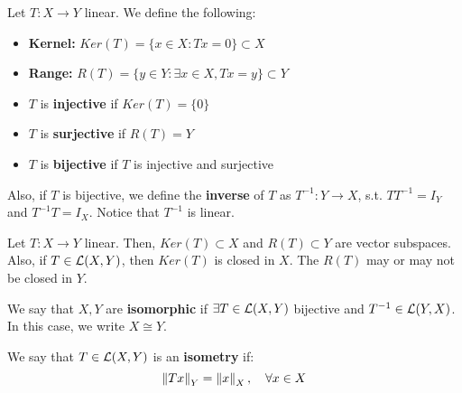 \begin{fdefinition}
    Let $T: X \to Y$ linear. We define the following:
    \vspace{1em}
    \begin{itemize}
        \item \textbf{Kernel:} $Ker(T) = \{x \in X: Tx = 0\} \subset X$
        \vspace{1em}
        \item \textbf{Range:} $R(T) = \{y \in Y: \exists x \in X, Tx = y\} \subset Y$
        \vspace{1em}
        \item $T$ is \textbf{injective} if $Ker(T) = \{0\}$
        \vspace{1em}
        \item $T$ is \textbf{surjective} if $R(T) = Y$
        \vspace{1em}
        \item $T$ is \textbf{bijective} if $T$ is injective and surjective
    \end{itemize}
    \vspace{1em}

    Also, if $T$ is bijective, we define the \textbf{inverse} of $T$ as $T^{-1}: Y \to X$,
    s.t. $T T^{-1} = I_Y$ and $T^{-1} T = I_X$.
    Notice that $T^{-1}$ is linear.
\end{fdefinition}

\begin{fremark}
    Let $T: X \to Y$ linear. Then, $Ker(T) \subset X$ and $R(T) \subset Y$ are
    vector subspaces. Also, if $T \in \mathcal{L}(X, Y)$, then $Ker(T)$ is closed in $X$.
    The $R(T)$ may or may not be closed in $Y$.
\end{fremark}

\vspace{1em}

\begin{fdefinition}[Isomorphism]
    We say that $X, Y$ are \textbf{isomorphic} if $\exists T \in \mathcal{L}(X, Y)$ bijective
    and $T^{-1} \in \mathcal{L}(Y, X)$.\\

    In this case, we write $X \cong Y$.
\end{fdefinition}

\begin{fdefinition}
     We say that $T \in \mathcal{L}(X, Y)$ is an \textbf{isometry} if:
     $$\left\|Tx\right\|_Y = \left\|x\right\|_X, \quad \forall x \in X$$
\end{fdefinition}

